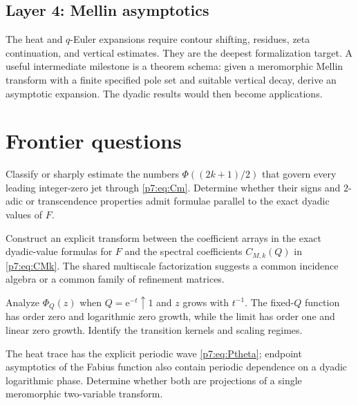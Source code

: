 \documentclass[11pt]{article}
\numberwithin{equation}{section}
\theoremstyle{definition}
\theoremstyle{remark}
\newcommand{\e}{\mathrm e}
\begin{document}
\subsection{Layer 4: Mellin asymptotics}

The heat and $q$-Euler expansions require contour shifting, residues, zeta continuation, and vertical estimates.  They are the deepest formalization target.  A useful intermediate milestone is a theorem schema: given a meromorphic Mellin transform with a finite specified pole set and suitable vertical decay, derive an asymptotic expansion.  The dyadic results would then become applications.

\section{Frontier questions}

\begin{problem}
Classify or sharply estimate the numbers $\Phi((2k+1)/2)$ that govern every leading integer-zero jet through \cref{p7:eq:Cm}.  Determine whether their signs and $2$-adic or transcendence properties admit formulae parallel to the exact dyadic values of $F$.
\end{problem}

\begin{problem}
Construct an explicit transform between the coefficient arrays in the exact dyadic-value formulas for $F$ and the spectral coefficients $C_{M,k}(Q)$ in \cref{p7:eq:CMk}.  The shared multiscale factorization suggests a common incidence algebra or a common family of refinement matrices.
\end{problem}

\begin{problem}
Analyze $\Phi_Q(z)$ when $Q=\e^{-t}\uparrow1$ and $z$ grows with $t^{-1}$.  The fixed-$Q$ function has order zero and logarithmic zero growth, while the limit has order one and linear zero growth.  Identify the transition kernels and scaling regimes.
\end{problem}

\begin{problem}
The heat trace has the explicit periodic wave \cref{p7:eq:Ptheta}; endpoint asymptotics of the Fabius function also contain periodic dependence on a dyadic logarithmic phase.  Determine whether both are projections of a single meromorphic two-variable transform.
\end{problem}
\end{document}
